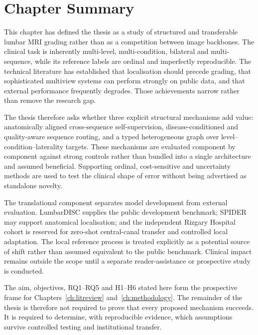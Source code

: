 \section{Chapter Summary}
\label{sec:intro-summary}

This chapter has defined the thesis as a study of structured and transferable lumbar
MRI grading rather than as a competition between image backbones. The clinical task
is inherently multi-level, multi-condition, bilateral and multi-sequence, while its
reference labels are ordinal and imperfectly reproducible. The technical literature
has established that localisation should precede grading, that sophisticated
multiview systems can perform strongly on public data, and that external performance
frequently degrades. Those achievements narrow rather than remove the research gap.

The thesis therefore asks whether three explicit structural mechanisms add value:
anatomically aligned cross-sequence self-supervision, disease-conditioned and
quality-aware sequence routing, and a typed heterogeneous graph over
level--condition--laterality targets. These mechanisms are evaluated component by
component against strong controls rather than bundled into a single architecture and
assumed beneficial. Supporting ordinal, cost-sensitive and uncertainty methods are
used to test the clinical shape of error without being advertised as standalone
novelty.

The translational component separates model development from external evaluation.
LumbarDISC supplies the public development benchmark; SPIDER may support anatomical
localisation; and the independent Rizgary Hospital cohort is reserved for zero-shot
central-canal transfer and controlled local adaptation. The local reference process
is treated explicitly as a potential source of shift rather than assumed equivalent
to the public benchmark. Clinical impact remains outside the scope until a separate
reader-assistance or prospective study is conducted.

The aim, objectives, RQ1--RQ5 and H1--H6 stated here form the prospective frame for
Chapters~\ref{ch:litreview} and~\ref{ch:methodology}. The remainder of the thesis is
therefore not required to prove that every proposed mechanism succeeds. It is
required to determine, with reproducible evidence, which assumptions survive
controlled testing and institutional transfer.

